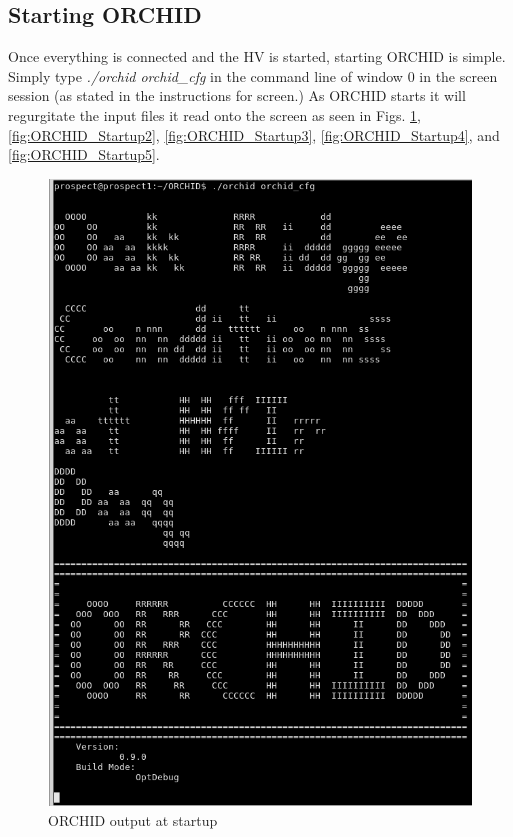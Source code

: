 \documentclass[onecolumn, 10pt, letterpaper, twoside]{article}
\begin{document}
\subsection{Starting ORCHID}
Once everything is connected and the HV is started, starting ORCHID is simple. Simply type \emph{./orchid orchid\_cfg} in the command line of window 0 in the screen session (as stated in the instructions for screen.) As ORCHID starts it will regurgitate the input files it read onto the screen as seen in Figs. \ref{fig:ORCHID_Startup1}, \ref{fig:ORCHID_Startup2}, \ref{fig:ORCHID_Startup3}, \ref{fig:ORCHID_Startup4}, and \ref{fig:ORCHID_Startup5}.
\begin{figure}[h!]
\begin{center}
\includegraphics[width=\textwidth]{./Start_Screen_1.png}
\caption{ORCHID output at startup}
\label{fig:ORCHID_Startup1}
\end{center}
\end{figure}
\end{document}
